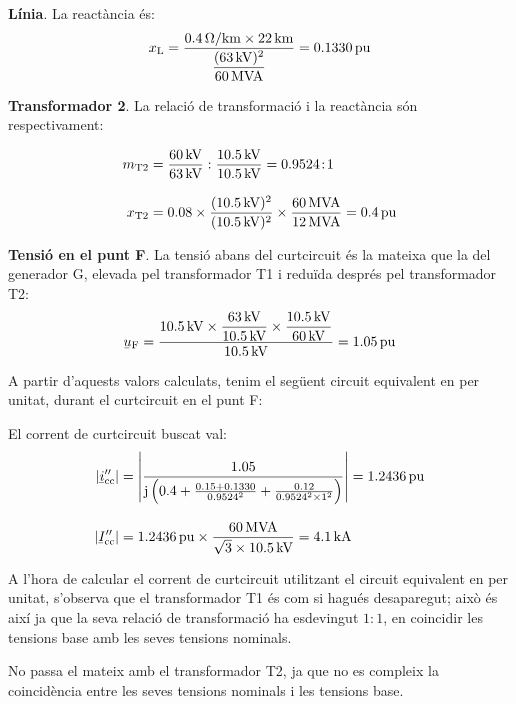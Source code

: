 \begin{exemple}
    \textbf{Línia}. La reactància és:
    \[
    x_\mathrm{L} = \frac{\SI{0,4}{\ohm/km} \times \SI{22}{km}} {\dfrac{(\SI{63}{kV})^2}{\SI{60}{MVA}}}  =
    \SI{0,1330}{pu}
    \]

    \textbf{Transformador 2}. La relació de transformació i la reactància són respectivament:

    \begin{align*}
    m_\mathrm{T2} &= \frac{\SI{60}{kV}}{\SI{63}{kV}} :
    \frac{\SI{10,5}{kV}}{\SI{10,5}{kV}} = \num{0,9524}\!:\!1 \\[3mm]
    x_\mathrm{T2} &= \num{0,08} \times \frac{(\SI{10,5}{kV})^2}{(\SI{10,5}{kV})^2} \times
    \frac{\SI{60}{MVA}}{\SI{12}{MVA}}  = \SI{0,4}{pu}
    \end{align*}

    \textbf{Tensió en el punt F}. La tensió abans del curtcircuit és la mateixa que la del generador G, elevada pel transformador T1 i reduïda després pel transformador T2:
    \[
    \cmplx{u}\ped{F} = \frac{\SI{10,5}{kV} \times
    \dfrac{\SI{63}{kV}}{\SI{10,5}{kV}} \times
    \dfrac{\SI{10,5}{kV}}{\SI{60}{kV}}}{\SI{10,5}{kV}} = \SI{1,05}{pu}
    \]

    A partir d'aquests valors calculats, tenim el següent circuit equivalent en per unitat, durant el
    curtcircuit en el punt F:

    \begin{center}
       
    \end{center}

    El corrent de curtcircuit buscat val:
    \begin{align*}
    |\cmplx{i}''\ped{cc}| &= \left| \frac{\num{1,05}}{\ju \left( \num{0,4} + \frac{\num{0,15} + \num{0,1330}}{\num{0,9524}^2} + \frac{\num{0,12}}{\num{0,9524}^2 \times 1^2} \right)} \right| =
     \SI{1,2436}{pu} \\[3mm]
     |\cmplx{I}''\ped{cc}| &= \SI{1,2436}{pu}\times\frac{\SI{60}{MVA}}{\sqrt{3}\times \SI{10,5}{kV}} =
     \SI{4,1}{kA}
    \end{align*}

     A l'hora de calcular el corrent de curtcircuit utilitzant el circuit equivalent en per unitat,
     s'observa que el transformador T1 és com si hagués desaparegut;
     això és així ja que la seva relació de transformació ha esdevingut
     $1\!:\!1$, en coincidir les tensions base amb les seves tensions nominals.

     No passa el mateix amb el transformador T2, ja que no es compleix
     la coincidència entre les seves tensions nominals i les tensions
     base.


\end{exemple}
